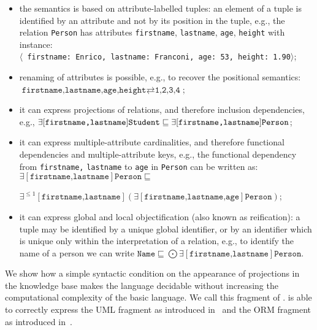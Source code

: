 \documentclass[envcountsame,draft]{llncs}
\newcommand{\lreif}[1]{\ensuremath{\bigodot#1}}
\begin{document}
\begin{itemize}
\item the semantics is based on attribute-labelled tuples: an element of a tuple is identified by an attribute and not by its position in the tuple, e.g.,
the relation \texttt{Person} has attributes \texttt{firstname}, \texttt{lastname}, \texttt{age}, \texttt{height} with instance:\\
\texttt{$\langle$ firstname: Enrico, lastname: Franconi, age: 53, height: 1.90$\rangle$};
\item renaming of attributes is possible, e.g., to recover the positional semantics:\\ $\texttt{firstname,lastname,age,height}\rightleftarrows \texttt{1,2,3,4}$;
\item it can express projections of relations, and therefore inclusion dependencies, e.g.,
$\exists [\texttt{firstname,lastname}]\texttt{Student}\sqsubseteq\exists [\texttt{firstname,lastname}]\texttt{Person}$;
\item it can express multiple-attribute cardinalities, and therefore functional dependencies and multiple-attribute keys, e.g., the functional dependency from \texttt{firstname,} \texttt{lastname} to \texttt{age} in \texttt{Person} can be written as:\\
$\exists[\texttt{firstname,lastname}] \texttt{Person} \sqsubseteq$ 

\hspace{2em} $\exists^{\leq 1}[\texttt{firstname,lastname}](\exists[\texttt{firstname,lastname,age}] \texttt{Person})$;
\item it can express global and local objectification (also known as reification): a tuple may be identified  by a unique global identifier, or by an identifier which is unique only within the interpretation of a relation, e.g., to identify the name of a person we can write 
$\texttt{Name}\sqsubseteq\lreif{\exists[\texttt{firstname,lastname}] \texttt{Person}} $.
\end{itemize}

We show how a simple syntactic condition on the appearance of projections in the knowledge base makes the language decidable without increasing the computational complexity of the basic \DLR language. We call \DLRpm this fragment of \DLRp. \DLRpm is able to correctly express the UML fragment as introduced in~\cite{BeCD05-AIJ-2005,ACKRZ:er07} and the ORM fragment as introduced in~\cite{DBLP:conf/otm/FranconiM13}.

\end{document}
